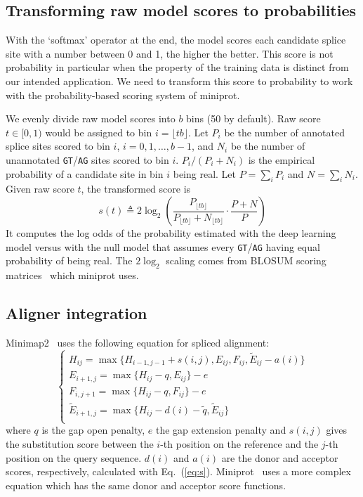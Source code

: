 \documentclass[webpdf,contemporary,large,namedate]{oup-authoring-template}%
\begin{document}
\subsection{Transforming raw model scores to probabilities}

With the `softmax' operator at the end,
the model scores each candidate splice site with a number between 0 and 1, the higher the better.
This score is not probability in particular when the property of the training data
is distinct from our intended application.
We need to transform this score to probability to work with the probability-based scoring system of miniprot.

We evenly divide raw model scores into $b$ bins (50 by default).
Raw score $t\in[0,1)$ would be assigned to bin $i=\lfloor tb\rfloor$.
Let $P_i$ be the number of annotated splice sites scored to bin $i$, $i=0,1,\ldots,b-1$,
and $N_i$ be the number of unannotated {\tt GT}/{\tt AG} sites scored to bin $i$.
$P_i/(P_i+N_i)$ is the empirical probability of a candidate site in bin $i$ being real.
Let $P=\sum_i P_i$ and $N=\sum_i N_i$.
Given raw score $t$, the transformed score is
\begin{equation}\label{eq:s}
s(t)\triangleq 2\log_2\left(\frac{P_{\lfloor tb\rfloor}}{P_{\lfloor tb\rfloor}+N_{\lfloor tb\rfloor}}\cdot\frac{P+N}{P}\right)
\end{equation}
It computes the log odds of the probability estimated with the deep learning model
versus with the null model that assumes every {\tt GT}/{\tt AG} having equal probability of being real.
The $2\log_2$ scaling comes from BLOSUM scoring matrices~\citep{Henikoff:1992tk} which miniprot uses.

\subsection{Aligner integration}

Minimap2~\citep{Li:2018ab} uses the following equation for spliced alignment:
\begin{equation}\label{eq:splice}
\left\{\begin{array}{l}
H_{ij} = \max\{H_{i-1,j-1}+s(i,j),E_{ij},F_{ij},\tilde{E}_{ij}-a(i)\}\\
E_{i+1,j}= \max\{H_{ij}-q,E_{ij}\}-e\\
F_{i,j+1}= \max\{H_{ij}-q,F_{ij}\}-e\\
\tilde{E}_{i+1,j}= \max\{H_{ij}-d(i)-\tilde{q},\tilde{E}_{ij}\}\\
\end{array}\right.
\end{equation}
where $q$ is the gap open penalty, $e$ the gap extension penalty
and $s(i,j)$ gives the substitution score between the $i$-th position
on the reference and the $j$-th position on the query sequence.
$d(i)$ and $a(i)$ are the donor and acceptor scores, respectively, calculated with Eq.~(\ref{eq:s}).
Miniprot~\citep{Li:2023ab} uses a more complex equation which has the same donor and acceptor score functions.
\end{document}
